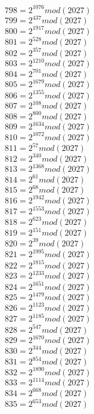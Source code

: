 \documentclass[12pt, letterpaper]{article}
\begin{document}
\begin{itemize}
\begin{multicols}{3}
$798= 2^{1076} mod (2027)$\\
$799= 2^{437} mod (2027)$\\
$800= 2^{1917} mod (2027)$\\
$801= 2^{528} mod (2027)$\\
$802= 2^{357} mod (2027)$\\
$803= 2^{1210} mod (2027)$\\
$804= 2^{701} mod (2027)$\\
$805= 2^{1679} mod (2027)$\\
$806= 2^{1355} mod (2027)$\\
$807= 2^{108} mod (2027)$\\
$808= 2^{800} mod (2027)$\\
$809= 2^{1634} mod (2027)$\\
$810= 2^{1072} mod (2027)$\\
$811= 2^{57} mod (2027)$\\
$812= 2^{340} mod (2027)$\\
$813= 2^{1368} mod (2027)$\\
$814= 2^{61} mod (2027)$\\
$815= 2^{68} mod (2027)$\\
$816= 2^{1942} mod (2027)$\\
$817= 2^{1553} mod (2027)$\\
$818= 2^{623} mod (2027)$\\
$819= 2^{151} mod (2027)$\\
$820= 2^{39} mod (2027)$\\
$821= 2^{1995} mod (2027)$\\
$822= 2^{1815} mod (2027)$\\
$823= 2^{1233} mod (2027)$\\
$824= 2^{1651} mod (2027)$\\
$825= 2^{1479} mod (2027)$\\
$826= 2^{1123} mod (2027)$\\
$827= 2^{1185} mod (2027)$\\
$828= 2^{547} mod (2027)$\\
$829= 2^{1670} mod (2027)$\\
$830= 2^{344} mod (2027)$\\
$831= 2^{854} mod (2027)$\\
$832= 2^{1890} mod (2027)$\\
$833= 2^{1114} mod (2027)$\\
$834= 2^{668} mod (2027)$\\
$835= 2^{653} mod (2027)$\\

\end{multicols}
\end{itemize}
\end{document}
